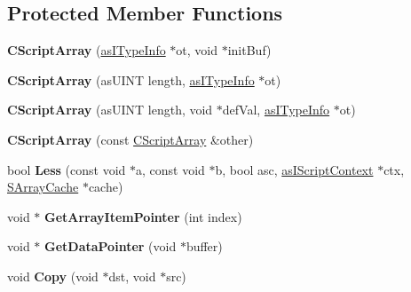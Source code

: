 \subsection*{Protected Member Functions}
\begin{DoxyCompactItemize}
\item 
\mbox{\label{class_c_script_array_a6f5c46cbb303342f09b45a4701db0fcc}} 
{\bfseries C\+Script\+Array} (\hyperlink{classas_i_type_info}{as\+I\+Type\+Info} $\ast$ot, void $\ast$init\+Buf)
\item 
\mbox{\label{class_c_script_array_a4f648c7b544c95f2d87efe5b8030cc02}} 
{\bfseries C\+Script\+Array} (as\+U\+I\+NT length, \hyperlink{classas_i_type_info}{as\+I\+Type\+Info} $\ast$ot)
\item 
\mbox{\label{class_c_script_array_ad5112daf3be11e9d9d0a2341dc4d1cd2}} 
{\bfseries C\+Script\+Array} (as\+U\+I\+NT length, void $\ast$def\+Val, \hyperlink{classas_i_type_info}{as\+I\+Type\+Info} $\ast$ot)
\item 
\mbox{\label{class_c_script_array_a0febe0c884c02f2b1efb4d73417d2bcf}} 
{\bfseries C\+Script\+Array} (const \hyperlink{class_c_script_array}{C\+Script\+Array} \&other)
\item 
\mbox{\label{class_c_script_array_a76531ec8ed4b809a6f18ea989c9ef79a}} 
bool {\bfseries Less} (const void $\ast$a, const void $\ast$b, bool asc, \hyperlink{classas_i_script_context}{as\+I\+Script\+Context} $\ast$ctx, \hyperlink{struct_s_array_cache}{S\+Array\+Cache} $\ast$cache)
\item 
\mbox{\label{class_c_script_array_aa8316ebce329c3b187a883b384623e2d}} 
void $\ast$ {\bfseries Get\+Array\+Item\+Pointer} (int index)
\item 
\mbox{\label{class_c_script_array_a96c38b510f6b5650de200636b53b0e6b}} 
void $\ast$ {\bfseries Get\+Data\+Pointer} (void $\ast$buffer)
\item 
\mbox{\label{class_c_script_array_abf5a7cbf943e08be36aba4a1efc5c61f}} 
void {\bfseries Copy} (void $\ast$dst, void $\ast$src)
\item 

\end{DoxyCompactItemize}
